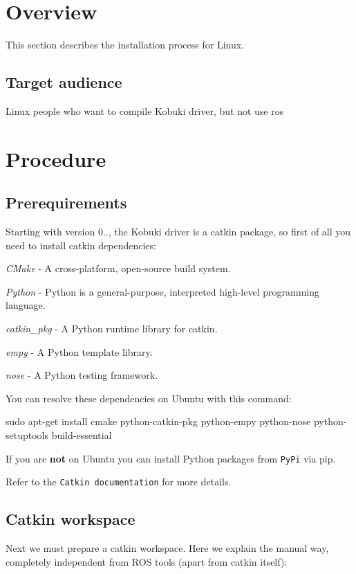 \section{\-Overview}\label{koMainPage_Overview}
\-This section describes the installation process for \-Linux.\subsection{\-Target audience}\label{enMainPage_who}
\-Linux people who want to compile \-Kobuki driver, but not use ros\section{\-Procedure}\label{enInstallationLinuxGuide_Procedure}
\subsection{\-Prerequirements}\label{enInstallationLinuxGuide_prereq}
\-Starting with version 0.., the \-Kobuki driver is a catkin package, so first of all you need to install catkin dependencies\-:


\begin{DoxyItemize}
\item {\itshape \-C\-Make\/} -\/ \-A cross-\/platform, open-\/source build system.
\item {\itshape \-Python\/} -\/ \-Python is a general-\/purpose, interpreted high-\/level programming language.
\item {\itshape catkin\-\_\-pkg\/} -\/ \-A \-Python runtime library for catkin.
\item {\itshape empy\/} -\/ \-A \-Python template library.
\item {\itshape nose\/} -\/ \-A \-Python testing framework.
\end{DoxyItemize}

\-You can resolve these dependencies on \-Ubuntu with this command\-:


\begin{DoxyCode}
  sudo apt-get install cmake python-catkin-pkg python-empy python-nose python-
      setuptools build-essential
\end{DoxyCode}


\-If you are {\bfseries not} on \-Ubuntu you can install \-Python packages from {\tt \-Py\-Pi} via pip.

\-Refer to the {\tt \-Catkin documentation} for more details.\subsection{\-Catkin workspace}\label{enInstallationLinuxGuide_catkin}
\-Next we must prepare a catkin workspace. \-Here we explain the manual way, completely independent from \-R\-O\-S tools (apart from catkin itself)\-:


